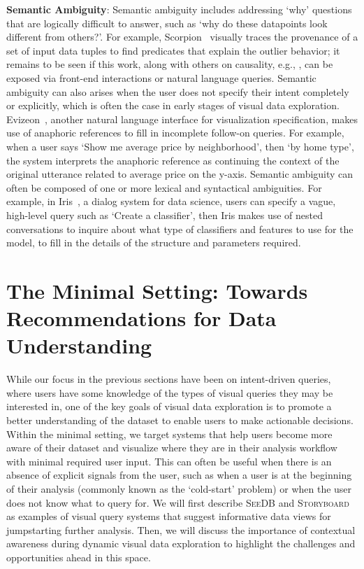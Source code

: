 \documentclass[11pt]{article}
\newcommand{\stitle}[1]{\par\noindent\textbf{#1}}
\newcommand{\sbd}{\textsc{Storyboard}\xspace}
\newcommand{\seedb}{\textsc{SeeDB}\xspace}
\begin{document}
\stitle{Semantic Ambiguity}: Semantic ambiguity 
includes addressing `why' questions 
that are logically difficult to answer, 
such as `why do these datapoints look different from others?'. 
For example, Scorpion~\cite{Wu2013} visually traces the provenance 
of a set of input data tuples to find predicates 
that explain the outlier behavior;
it remains to be seen if this work, along with others
on causality, e.g., \cite{meliou2010causality,roy2014formal},
can be exposed via front-end interactions or natural language
queries. 
Semantic ambiguity can also arises 
when the user does not specify their 
intent completely or explicitly, 
which is often the case in early stages 
of visual data exploration. 
Evizeon~\cite{Hoque2017}, 
another natural language interface for visualization
specification, 
makes use of anaphoric references 
to fill in incomplete follow-on queries. 
For example, when a user says 
`Show me average price by neighborhood', 
then `by home type', the system interprets 
the anaphoric reference as continuing the 
context of the original utterance related 
to average price on the y-axis. 
Semantic ambiguity can often be composed 
of one or more lexical and syntactical ambiguities. 
For example, in Iris~\cite{Fast2018}, a dialog system for
data science, users can specify a vague, 
high-level query such as `Create a classifier', 
then Iris makes use of nested conversations 
to inquire about what type of classifiers and features to use for the model, 
to fill in the details of the structure and parameters required. 

\section{The Minimal Setting: Towards Recommendations for Data Understanding}\label{sec:minimal}
\par While our focus in the previous sections 
have been on intent-driven queries, 
where users have some knowledge 
of the types of visual queries they may be interested in, 
one of the key goals of visual data exploration 
is to promote a better understanding of the dataset 
to enable users to make actionable decisions. 
Within the minimal setting, we target
systems that help users become more 
aware of their dataset and visualize 
where they are in their analysis workflow 
with minimal required user input. 
This can often be useful when 
there is an absence of explicit signals from the user, 
such as when a user is at the 
beginning of their analysis 
(commonly known as the `cold-start' problem) 
or when the user does not know what to query for. 
We will first describe \seedb and \sbd as 
examples of visual query systems 
that suggest informative data views 
for jumpstarting further analysis. 
Then, we will discuss the importance 
of contextual awareness during dynamic visual data exploration to highlight the challenges and opportunities ahead in this space.
\end{document}
